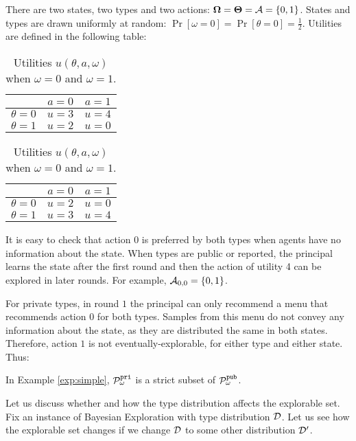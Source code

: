 \begin{example}
\label{exp:simple}
There are two states, two types and two actions: 
    $\bold{\Omega} = \bold{\Theta} = \mathcal{A} = \{0,1\}$. 
States and types are drawn uniformly at random:
    $\Pr[\omega =0] =\Pr[\theta =0] = \tfrac12$. 
Utilities are defined in the following table:\\
\begin{table}[H]
\centering
\begin{tabular}{|c||c|c|}
\hline
&$a=0$&$a=1$\\
\hline
\hline
$\theta = 0$& $u = 3$ & $u =4$\\
\hline
$\theta = 1$& $u = 2$ & $u =0$\\
\hline
\end{tabular}
\quad
\begin{tabular}{|c||c|c|}
\hline
&$a=0$&$a=1$\\
\hline
\hline
$\theta = 0$& $u = 2$ & $u =0$\\
\hline
$\theta = 1$& $u = 3$ & $u =4$\\
\hline
\end{tabular}
\caption{Utilities $u(\theta,a,\omega)$ when $\omega =0 $ and $\omega = 1$.}
\end{table}
\end{example}

It is easy to check that action 0 is preferred by both types when agents have no information about the state. When types are public or reported, the principal learns the state after the first round and then the action of utility 4 can be explored in later rounds. For example, $\mathcal{A}_{0,0} = \{0,1\}$.

For private types, in round $1$ the principal can only recommend a menu that recommends action 0 for both types. Samples from this menu do not convey any information about the state, as they are distributed the same in both states. Therefore, action $1$ is not eventually-explorable, for either type and either state.  Thus:

\begin{claim}
In Example \ref{exp:simple}, $\mathcal{P}_\omega^{\mathtt{pri}}$ is a strict subset of $\mathcal{P}_\omega^{\mathtt{pub}}$.
\end{claim}

Let us discuss whether and how the type distribution affects the explorable set. Fix an instance of Bayesian Exploration with type distribution $\mathcal{D}$. Let us see how the explorable set changes if we change $\mathcal{D}$ to some other distribution $\mathcal{D}'$. 

